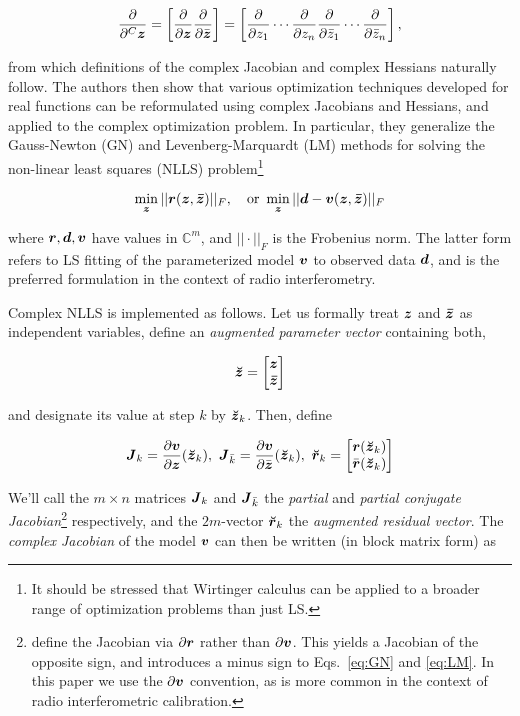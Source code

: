 \documentclass[useAMS,usenatbib]{mn2e}
\makeatletter
\newcommand{\COMPLEX}{\mathbb{C}}
\newcommand{\zz}{\bmath{z}}
\newcommand{\zzc}{\bmath{\bar z}}
\newcommand{\rr}{\bmath{r}}
\newcommand{\vv}{\bmath{v}}
\newcommand{\mat}[1]{{\bmath{#1}}}
\newcommand{\JJ}{\mat{J}} %
\newcommand{\Matrix}[2]{\left [ \begin{array}{@{}#1@{}}#2\end{array} \right ]}
\newcommand{\AUG}[1]{\bmath{\breve{#1}}}
\newcommand{\Zz}{\AUG{z}}
\newcommand{\Rr}{\AUG{r}}
\makeatother
\begin{document}
\[
\frac{\partial}{\partial^C \zz} = \left [ \frac{\partial}{\partial \zz} \frac{\partial}{\partial \bar{\zz}} \right ] = \left [ \frac{\partial}{\partial z_1} \cdots \frac{\partial}{\partial z_n}
\frac{\partial}{\partial \bar{z}_1} \cdots \frac{\partial}{\partial \bar{z}_n} \right ],
\]

from which definitions of the complex Jacobian and complex Hessians naturally follow. The authors then show 
that various optimization techniques developed for real functions can be reformulated using 
complex Jacobians and Hessians, and applied to the complex optimization problem. In particular, they generalize 
the Gauss-Newton (GN) and Levenberg-Marquardt (LM) methods for solving the non-linear least squares (NLLS) 
problem\footnote{It should be stressed that Wirtinger calculus can be applied to a broader range of 
optimization problems than just LS.}

\begin{equation}
\label{eq:LSmin}
\min_{\bmath{z}} ||\bmath{r}(\zz,\zzc)||_F,~~~\mathrm{or}~\min_{\bmath{z}} ||\bmath{d}-\bmath{v}(\zz,\zzc)||_F
\end{equation}

where $\bmath{r},\bmath{d},\bmath{v}$ have values in $\COMPLEX^m$, and $||\cdot||_F$ is the Frobenius norm. The latter form 
refers to LS fitting of the parameterized model $\bmath{v}$ to observed data $\bmath{d}$, and is the preferred formulation
in the context of radio interferometry.

Complex NLLS is implemented as follows. Let us formally treat $\zz$ and $\zzc$ as independent variables, 
define an {\em augmented parameter vector} containing both,



\[
\Zz = \Matrix{c}{\zz \\ \zzc}
\]


and designate its value at step $k$ by $\Zz_k$. Then, define


\begin{equation}
\label{eq:Jkrk}
\JJ_k=\frac{\partial \vv}{\partial \zz} (\Zz_k), ~\JJ_{\bar{k}}=\frac{\partial \vv}{\partial \bar{\zz}}(\Zz_k),~
\Rr_k=\Matrix{c}{\rr(\Zz_k)\\\bar{\rr}(\Zz_k)}
\end{equation}

We'll call the $m\times n$ matrices $\JJ_k$ and $\JJ_{\bar{k}}$ the \emph{partial} and \emph{partial conjugate 
Jacobian}\footnote{\citet{ComplexOpt} define the Jacobian via $\partial\rr$ rather than
$\partial\vv$. This yields a Jacobian of the opposite sign, and introduces a minus sign to 
Eqs.~\ref{eq:GN} and \ref{eq:LM}. In this paper we use the $\partial\vv$ convention, as is more common in the
context of radio interferometric calibration.}
respectively, 
and the $2m$-vector $\Rr_k$ the \emph{augmented residual vector}. The \emph{complex Jacobian} 
of the model $\vv$ can then be written (in block matrix form) as
\end{document}

